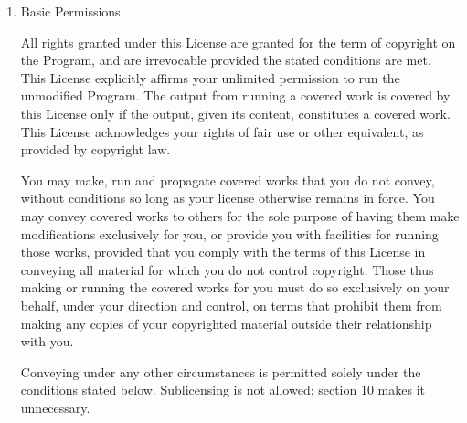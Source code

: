 {\begin{enumerate}
	The ``Corresponding Source'' for a work in object code form means all
	the source code needed to generate, install, and (for an executable
	work) run the object code and to modify the work, including scripts to
	control those activities.  However, it does not include the work's
	System Libraries, or general-purpose tools or generally available free
	programs which are used unmodified in performing those activities but
	which are not part of the work.  For example, Corresponding Source
	includes interface definition files associated with source files for
	the work, and the source code for shared libraries and dynamically
	linked subprograms that the work is specifically designed to require,
	such as by intimate data communication or control flow between those
	subprograms and other parts of the work.
	
	The Corresponding Source need not include anything that users
	can regenerate automatically from other parts of the Corresponding
	Source.
	
	The Corresponding Source for a work in source code form is that
	same work.
	
	\item Basic Permissions.
	
	All rights granted under this License are granted for the term of
	copyright on the Program, and are irrevocable provided the stated
	conditions are met.  This License explicitly affirms your unlimited
	permission to run the unmodified Program.  The output from running a
	covered work is covered by this License only if the output, given its
	content, constitutes a covered work.  This License acknowledges your
	rights of fair use or other equivalent, as provided by copyright law.
	
	You may make, run and propagate covered works that you do not
	convey, without conditions so long as your license otherwise remains
	in force.  You may convey covered works to others for the sole purpose
	of having them make modifications exclusively for you, or provide you
	with facilities for running those works, provided that you comply with
	the terms of this License in conveying all material for which you do
	not control copyright.  Those thus making or running the covered works
	for you must do so exclusively on your behalf, under your direction
	and control, on terms that prohibit them from making any copies of
	your copyrighted material outside their relationship with you.
	
	Conveying under any other circumstances is permitted solely under
	the conditions stated below.  Sublicensing is not allowed; section 10
	makes it unnecessary.
	

\end{enumerate}}
